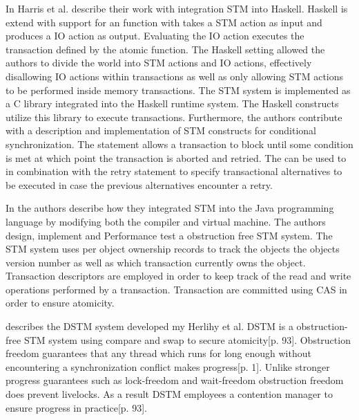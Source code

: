 In \cite{harris2005composable} Harris et al. describe their work with integration \ac{STM} into Haskell. Haskell is extend with support for an  function with takes a \ac{STM} action as input and produces a \ac{IO} action as output\cite[p. 51]{harris2005composable}. Evaluating the IO action executes the transaction defined by the atomic function. The Haskell setting allowed the authors to divide the world into \ac{STM} actions and \ac{IO} actions\cite[p. 51]{harris2005composable}, effectively disallowing \ac{IO} actions within transactions as well as only allowing \ac{STM} actions to be performed inside memory transactions. The \ac{STM} system is implemented as a C library integrated into the Haskell runtime system. The Haskell constructs utilize this library to execute transactions\cite[p. 56]{harris2005composable}. Furthermore, the authors contribute with a description and implementation of \ac{STM} constructs for conditional synchronization. The  statement allows a transaction to block until some condition is met at which point the transaction is aborted and retried\cite[p. 52]{harris2005composable}. The  can be used to in combination with the retry statement to specify transactional alternatives to be executed in case the previous alternatives encounter a retry\cite[p. 52]{harris2005composable}.


In \cite{harris2003language} the authors describe how they integrated \ac{STM} into the Java programming language by modifying both the compiler\cite[p. 4]{harris2003language} and virtual machine\cite[p. 9]{harris2003language}. The authors design, implement and Performance test a obstruction free \ac{STM} system. The \ac{STM} system uses per object ownership records to track the objects the objects version number as well as which transaction currently owns the object\cite[p. 6]{harris2003language}. Transaction descriptors are employed in order to keep track of the read and write operations performed by a transaction.
Transaction are committed  using \ac{CAS} in order to ensure atomicity\cite[p. 7]{harris2003language}.

\cite{herlihy2003software} describes the DSTM system developed my Herlihy et al. DSTM is a obstruction-free\cite{herlihy2003obstruction} \ac{STM} system using compare and swap to secure atomicity\cite{herlihy2003software}[p. 93]. Obstruction freedom guarantees that any thread which runs for long enough without encountering a synchronization conflict makes progress\cite{herlihy2003obstruction}[p. 1]. Unlike stronger progress guarantees such as lock-freedom and wait-freedom obstruction freedom does prevent livelocks. As a result DSTM employees a contention manager to ensure progress in practice\cite{herlihy2003software}[p. 93].

\worksheetend